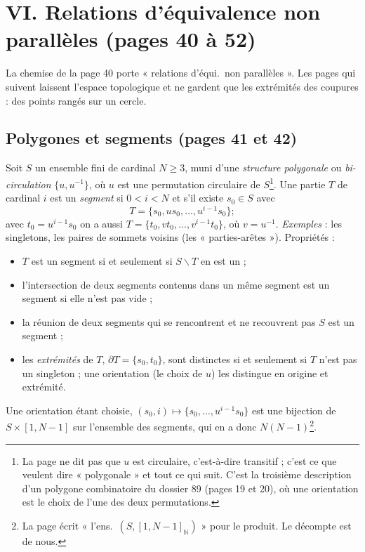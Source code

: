 \documentclass[11pt,a4paper]{article}
\begin{document}
\section*{VI. Relations d'équivalence non parallèles (pages 40 à 52)}

La chemise de la page 40 porte « relations d'équi.\ non parallèles ». Les
pages qui suivent laissent l'espace topologique et ne gardent que les
extrémités des coupures : des points rangés sur un cercle.

\subsection*{Polygones et segments (pages 41 et 42)}

Soit $S$ un ensemble fini de cardinal $N \geqslant 3$, muni d'une
\emph{structure polygonale} ou \emph{bi-circulation} $\{u, u^{-1}\}$, où $u$
est une permutation circulaire de $S$\footnote{La page ne dit pas que $u$
est circulaire, c'est-à-dire transitif ; c'est ce que veulent dire
« polygonale » et tout ce qui suit. C'est la troisième description d'un
polygone combinatoire du dossier 89 (pages 19 et 20), où une orientation
est le choix de l'une des deux permutations.}. Une partie $T$ de cardinal $i$
est un \emph{segment} si $0 < i < N$ et s'il existe $s_0 \in S$ avec
\[
T = \{s_0, u s_0, \ldots, u^{i-1} s_0\} ;
\]
avec $t_0 = u^{i-1} s_0$ on a aussi $T = \{t_0, v t_0, \ldots, v^{i-1} t_0\}$,
où $v = u^{-1}$. \emph{Exemples} : les singletons, les paires de sommets
voisins (les « parties-arêtes »). Propriétés :
\begin{itemize}
  \item $T$ est un segment si et seulement si $S \smallsetminus T$ en est un ;
  \item l'intersection de deux segments contenus dans un même segment est un
  segment si elle n'est pas vide ;
  \item la réunion de deux segments qui se rencontrent et ne recouvrent pas
  $S$ est un segment ;
  \item les \emph{extrémités} de $T$, $\partial T = \{s_0, t_0\}$, sont
  distinctes si et seulement si $T$ n'est pas un singleton ; une orientation
  (le choix de $u$) les distingue en origine et extrémité.
\end{itemize}
Une orientation étant choisie, $(s_0, i) \mapsto \{s_0, \ldots, u^{i-1}
s_0\}$ est une bijection de $S \times [1, N-1]$ sur l'ensemble des
segments, qui en a donc $N(N-1)$\footnote{La page écrit « l'ens.\
$(S,[1,N-1]_{\mathbb{N}})$ » pour le produit. Le décompte est de nous.}.
\end{document}
